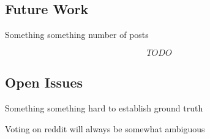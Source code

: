 \lipsum[1]

\subsection{Future Work} %
\label{sub:future_work}

Something something number of posts

\[TODO\]



\subsection{Open Issues} %
\label{sub:open_issues}

Something something hard to establish ground truth

Voting on reddit will always be somewhat ambiguous

